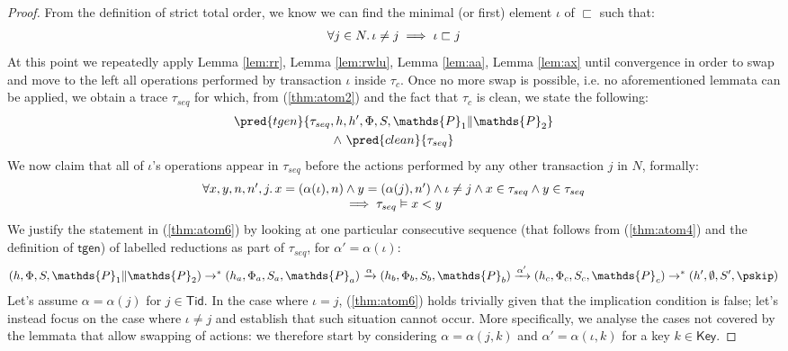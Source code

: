 {\begin{proof}
From the definition of strict total order, we know we can find the minimal (or first) element $\iota$ of $\sqsubset$ such that:
\begin{gather}
	\label{thm:atom3} \forall j \in N \ldotp \iota \neq j \implies \iota \sqsubset j
\end{gather}
At this point we repeatedly apply Lemma \ref{lem:rr}, Lemma \ref{lem:rwlu}, Lemma \ref{lem:aa}, Lemma \ref{lem:ax} until convergence in order to swap and move to the left all operations performed by transaction $\iota$ inside $\tau_c$. Once no more swap is possible, i.e. no aforementioned lemmata can be applied, we obtain a trace $\tau_{seq}$ for which, from (\ref{thm:atom2}) and the fact that $\tau_c$ is clean, we state the following:
\begin{gather}
	\label{thm:atom4} \pred{tgen}{\tau_{seq}, h, h', \Phi, S, \mathds{P}_1 \| \mathds{P}_2} \\
		\land\
	\label{thm:atom7} \pred{clean}{\tau_{seq}}
\end{gather}
We now claim that all of $\iota$'s operations appear in $\tau_{seq}$ before the actions performed by any other transaction $j$ in $N$, formally:
\begin{gather}
	\label{thm:atom6}
	\begin{array}{c}
		\forall x, y, n, n', j \ldotp
	x = (\alpha(\iota), n) \land y = (\alpha(j), n') \land \iota \neq j \land x \in \tau_{seq} \land y \in \tau_{seq} \\
	\implies \tau_{seq} \vDash x < y
	\end{array}
\end{gather}
We justify the statement in (\ref{thm:atom6}) by looking at one particular consecutive sequence (that follows from (\ref{thm:atom4}) and the definition of $\mathsf{tgen}$) of labelled reductions as part of $\tau_{seq}$, for $\alpha' = \alpha(\iota)$:
\begin{gather*}
	(h, \Phi, S, \mathds{P}_1 \| \mathds{P}_2)
		\rightarrow^*
	(h_a, \Phi_a, S_a, \mathds{P}_a)
		\xrightarrow{\alpha}
	(h_b, \Phi_b, S_b, \mathds{P}_b)
		\xrightarrow{\alpha'}
	(h_c, \Phi_c, S_c, \mathds{P}_c)
		\rightarrow^*
	(h', \emptyset, S', \pskip)
\end{gather*}
Let's assume $\alpha = \alpha(j)$ for $j \in \mathsf{Tid}$. In the case where $\iota = j$, (\ref{thm:atom6}) holds trivially given that the implication condition is false; let's instead focus on the case where $\iota \neq j$ and establish that such situation cannot occur. More specifically, we analyse the cases not covered by the lemmata that allow swapping of actions: we therefore start by considering $\alpha = \alpha(j, k)$ and $\alpha' = \alpha(\iota, k)$ for a key $k \in \mathsf{Key}$.

\end{proof}}
